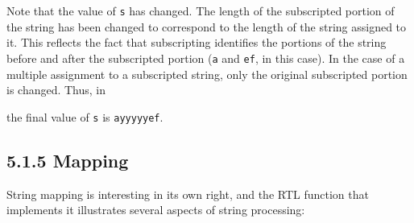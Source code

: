 Note that the value of \texttt{s} has changed. The length of the
subscripted portion of the string has been changed to correspond to
the length of the string assigned to it. This reflects the fact that
subscripting identifies the portions of the string before and after
the subscripted portion (\texttt{{\textquotedbl}a{\textquotedbl}} and
\texttt{{\textquotedbl}ef{\textquotedbl}}, in this case). In the case
of a multiple assignment to a subscripted string, only the original
subscripted portion is changed. Thus, in


\noindent the final value of \texttt{s} is
\texttt{{\textquotedbl}ayyyyyef{\textquotedbl}}.

\subsection[5.1.5 Mapping]{5.1.5 Mapping}

String mapping is interesting in its own right, and the RTL function
that implements it illustrates several aspects of string processing:

